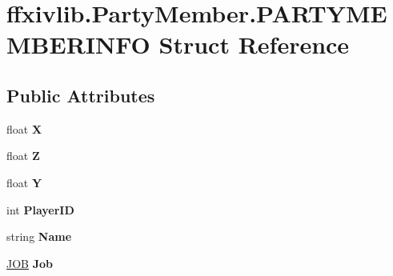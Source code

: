 \hypertarget{structffxivlib_1_1_party_member_1_1_p_a_r_t_y_m_e_m_b_e_r_i_n_f_o}{\section{ffxivlib.\-Party\-Member.\-P\-A\-R\-T\-Y\-M\-E\-M\-B\-E\-R\-I\-N\-F\-O Struct Reference}
\label{structffxivlib_1_1_party_member_1_1_p_a_r_t_y_m_e_m_b_e_r_i_n_f_o}
}
\subsection*{Public Attributes}
\begin{DoxyCompactItemize}
\item 
\hypertarget{structffxivlib_1_1_party_member_1_1_p_a_r_t_y_m_e_m_b_e_r_i_n_f_o_a3fb2b0e1d689bff2f014f3a5c62c1b10}{float {\bfseries X}}\label{structffxivlib_1_1_party_member_1_1_p_a_r_t_y_m_e_m_b_e_r_i_n_f_o_a3fb2b0e1d689bff2f014f3a5c62c1b10}

\item 
\hypertarget{structffxivlib_1_1_party_member_1_1_p_a_r_t_y_m_e_m_b_e_r_i_n_f_o_a369a848b2aebd5fe73681193669aa2c5}{float {\bfseries Z}}\label{structffxivlib_1_1_party_member_1_1_p_a_r_t_y_m_e_m_b_e_r_i_n_f_o_a369a848b2aebd5fe73681193669aa2c5}

\item 
\hypertarget{structffxivlib_1_1_party_member_1_1_p_a_r_t_y_m_e_m_b_e_r_i_n_f_o_aa6de8771062f75d37ace78b480b2f981}{float {\bfseries Y}}\label{structffxivlib_1_1_party_member_1_1_p_a_r_t_y_m_e_m_b_e_r_i_n_f_o_aa6de8771062f75d37ace78b480b2f981}

\item 
\hypertarget{structffxivlib_1_1_party_member_1_1_p_a_r_t_y_m_e_m_b_e_r_i_n_f_o_a58cd6e399a19de16d25ddd42e8518144}{int {\bfseries Player\-I\-D}}\label{structffxivlib_1_1_party_member_1_1_p_a_r_t_y_m_e_m_b_e_r_i_n_f_o_a58cd6e399a19de16d25ddd42e8518144}

\item 
\hypertarget{structffxivlib_1_1_party_member_1_1_p_a_r_t_y_m_e_m_b_e_r_i_n_f_o_a558a18278b2c9ecc45ead1e38fbc151a}{string {\bfseries Name}}\label{structffxivlib_1_1_party_member_1_1_p_a_r_t_y_m_e_m_b_e_r_i_n_f_o_a558a18278b2c9ecc45ead1e38fbc151a}

\item 
\hypertarget{structffxivlib_1_1_party_member_1_1_p_a_r_t_y_m_e_m_b_e_r_i_n_f_o_afed8db50d29cf44fb3a0c2eb49b6d39b}{\hyperlink{namespaceffxivlib_a7273810711af045adb7151580e025a86}{J\-O\-B} {\bfseries Job}}\label{structffxivlib_1_1_party_member_1_1_p_a_r_t_y_m_e_m_b_e_r_i_n_f_o_afed8db50d29cf44fb3a0c2eb49b6d39b}


\end{DoxyCompactItemize}
